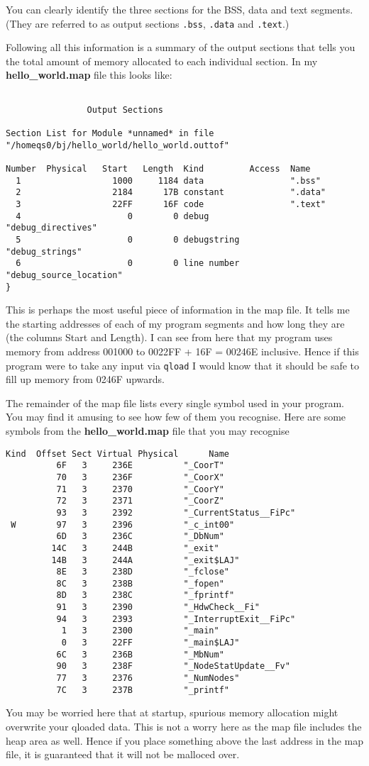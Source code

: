 You can clearly identify the three sections for the BSS, data and text segments.
(They are referred to as output sections {\tt .bss}, {\tt .data} and {\tt .text}.)

Following all this information is a summary of the output sections that
tells you the total amount of memory allocated to each individual section.
In my {\bf hello\_world.map} file this looks like:
{\small
\begin{verbatim}

                Output Sections

Section List for Module *unnamed* in file
"/homeqs0/bj/hello_world/hello_world.outtof"

Number  Physical   Start   Length  Kind         Access  Name
  1                  1000     1184 data                 ".bss"
  2                  2184      17B constant             ".data"
  3                  22FF      16F code                 ".text"
  4                     0        0 debug                "debug_directives"
  5                     0        0 debugstring          "debug_strings"
  6                     0        0 line number          "debug_source_location"
}
\end{verbatim}}
This is perhaps the most useful piece of information in the map file.
It tells me the starting addresses of each of my program segments and 
how long they are (the columns Start and Length). I can see from here that 
my program uses memory from address 001000 to 0022FF + 16F = 00246E inclusive.
Hence if this program were to take any input via {\tt qload} I would 
know that it should be safe to fill up memory from 0246F upwards.

The remainder of the map file lists every single symbol used in your
program. You may find it amusing to see how few of them you recognise.
Here are some symbols from the {\bf hello\_world.map} file that you 
may recognise
{\small
\begin{verbatim}
Kind  Offset Sect Virtual Physical      Name
          6F   3     236E          "_CoorT"
          70   3     236F          "_CoorX"
          71   3     2370          "_CoorY"
          72   3     2371          "_CoorZ"
          93   3     2392          "_CurrentStatus__FiPc"
 W        97   3     2396          "_c_int00"
          6D   3     236C          "_DbNum"
         14C   3     244B          "_exit"
         14B   3     244A          "_exit$LAJ"
          8E   3     238D          "_fclose"
          8C   3     238B          "_fopen"
          8D   3     238C          "_fprintf"
          91   3     2390          "_HdwCheck__Fi"
          94   3     2393          "_InterruptExit__FiPc"
           1   3     2300          "_main"
           0   3     22FF          "_main$LAJ"
          6C   3     236B          "_MbNum"
          90   3     238F          "_NodeStatUpdate__Fv"
          77   3     2376          "_NumNodes"
          7C   3     237B          "_printf"
\end{verbatim}
}
You may be worried here that at startup, spurious memory allocation
might overwrite your qloaded data. This is not a worry here as the
map file includes the heap area as well. Hence if you place something
above the last address in the map file, it is guaranteed that it 
will not be malloced over. 


